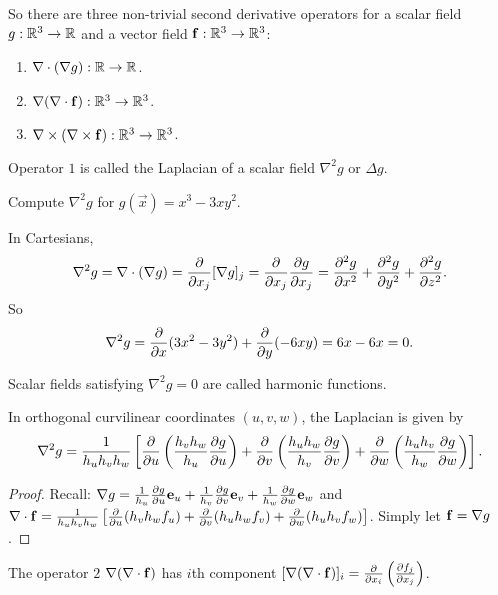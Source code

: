 \documentclass[10pt, a4paper]{article}
\begin{document}
So there are three non-trivial second derivative operators for a scalar field $g : \R ^ 3 \to \R$ and a vector field $\vec{f} : \R ^ 3 \to \R ^ 3$:
\begin{enumerate}[label = (\arabic*)]
    \item $\bnabla \cdot (\bnabla g) : \R \to \R$.
    
    \item $\bnabla (\bnabla \cdot \vec{f}) : \R ^ 3 \to \R ^ 3$.

    \item $\bnabla \times (\bnabla \times \vec{f}) : \R ^ 3 \to \R ^ 3$.
\end{enumerate}
Operator $1$ is called the Laplacian of a scalar field $\nabla ^ 2g$ or $\Delta g$.

\begin{example}
    Compute $\nabla ^ 2g$ for $g(\vec{x}) = x ^ 3 - 3xy ^ 2$.

    In Cartesians,
    \[
    \nabla ^ 2g = \bnabla \cdot (\bnabla g) = \pd{x_j}[\bnabla g]_j = \pd{x_j}\pd[g]{x_j} = \frac{\partial ^ 2g}{\partial x ^ 2} + \frac{\partial ^ 2g}{\partial y ^ 2} + \frac{\partial ^ 2g}{\partial z ^ 2}.
    \]
    So
    \[
    \nabla ^ 2g = \pd{x}(3x ^ 2 - 3y ^ 2) + \pd{y}(-6xy) = 6x - 6x = 0.
    \]
\end{example}

\begin{remark}
    Scalar fields satisfying $\nabla ^ 2g = 0$ are called harmonic functions.
\end{remark}

\begin{proposition}
    In orthogonal curvilinear coordinates $(u, v, w)$,
    the Laplacian is given by
    \[
    \nabla ^ 2g = \frac{1}{h_uh_vh_w}\left[\pd{u}\left(\frac{h_vh_w}{h_u}\pd[g]{u}\right) + \pd{v}\left(\frac{h_uh_w}{h_v}\pd[g]{v}\right) + \pd{w}\left(\frac{h_uh_v}{h_w}\pd[g]{w}\right)\right].
    \]

    \begin{proof}
        Recall:
        $\bnabla g = \frac{1}{h_u}\pd[g]{u}\vec{e}_u + \frac{1}{h_v}\pd[g]{v}\vec{e}_v + \frac{1}{h_w}\pd[g]{w}\vec{e}_w$ and $\bnabla\cdot\vec{f} = \frac{1}{h_uh_vh_w}\left[\pd{u}(h_vh_wf_u) + \pd{v}(h_uh_wf_v) + \pd{w}(h_uh_vf_w)\right]$.
        Simply let $\vec{f} = \bnabla g$.
    \end{proof}
\end{proposition}

The operator $2$ $\bnabla(\bnabla \cdot \vec{f})$ has $i$th component $[\bnabla(\bnabla \cdot \vec{f})]_i = \pd{x_i}\left(\pd[f_j]{x_j}\right)$.
\end{document}
